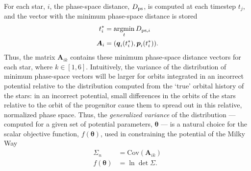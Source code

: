 \documentclass[preprint]{aastex}
\newcommand{\bs}{\boldsymbol}
\newcommand{\argmin}{\operatornamewithlimits{argmin}}
\begin{document}

For each star, $i$,
the phase-space distance, $D_{\rm ps}$, is computed at each timestep
$t_{j}$, and the vector with the minimum phase-space distance is stored
\begin{align}
  t^*_{i} &= \argmin_{t} D_{{\rm ps},i}\\
  \bs{A}_{i} &= (\bs{q}_{i}(t^*_{i}),\bs{p}_{i}(t^*_{i})).
\end{align}
Thus, the matrix $\bs{A}_{ik}$ contains these minimum phase-space
distance vectors for each star, where $k\in[1,6]$. Intuitively, the
variance of the distribution of minimum phase-space vectors will be
larger for orbits integrated in an incorrect potential relative to the
distribution computed from the `true' orbital history of the stars: in
an incorrect potential, small differences in the orbits of the stars
relative to the orbit of the progenitor cause them to spread out in
this relative, normalized phase space. Thus, the \emph{generalized
  variance} of the distribution --- computed for a given set of
potential parameters, $\bs{\theta}$ --- is a natural choice for the
scalar objective function, $f(\bs{\theta})$, used in constraining the potential of the
Milky Way
\begin{align}
  \Sigma_n &= \mathrm{Cov}( \bs{A}_{ik}) \\
  f(\bs{\theta}) &= \ln \det \Sigma.
\end{align}

\end{document}
